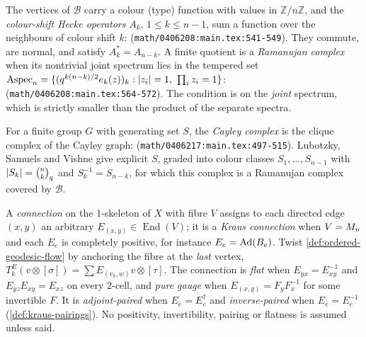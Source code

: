 \begin{definition}
\label{def:bruhat-tits-building}
The vertices of $\mathcal B$ carry a colour (type) function with values in
$\mathbb Z/n\mathbb Z$, and the \emph{colour-shift Hecke operators} $A_k$,
$1\le k\le n-1$, sum a function over the neighbours of colour shift $k$:
{\small\texttt{}}
(\texttt{math/0406208:main.tex:541-549}). They commute, are normal, and satisfy
$A_k^* = A_{n-k}$. A finite quotient is a \emph{Ramanujan complex} when its
nontrivial joint spectrum lies in the tempered set
$\mathrm{Aspec}_n = \{(q^{k(n-k)/2}e_k(z))_k : |z_i| = 1,\ \prod_iz_i = 1\}$:
{\small\texttt{}}
(\texttt{math/0406208:main.tex:564-572}). The condition is on the \emph{joint}
spectrum, which is strictly smaller than the product of the separate spectra.
\end{definition}

\begin{definition}
\label{def:cayley-complex}
For a finite group $G$ with generating set $S$, the \emph{Cayley complex} is the
clique complex of the Cayley graph:
{\small\texttt{}}
(\texttt{math/0406217:main.tex:497-515}). Lubotzky, Samuels and Vishne give
explicit $S$, graded into colour classes $S_1,\dots,S_{n-1}$ with
$|S_k| = \binom{n}{k}_{q}$ and $S_k^{-1} = S_{n-k}$, for which this complex is
a Ramanujan complex covered by $\mathcal B$.
\end{definition}

\begin{definition}
\label{def:kraus-connection}
A \emph{connection} on the 1-skeleton of $X$ with fibre $V$ assigns to each
directed edge $(x,y)$ an arbitrary $E_{(x,y)}\in\operatorname{End}(V)$; it is a
\emph{Kraus connection} when $V = M_n$ and each $E_e$ is completely positive,
for instance $E_e = \operatorname{Ad}(B_e)$. Twist \cref{def:ordered-geodesic-flow} by
anchoring the fibre at the \emph{last} vertex,
$T^E_k(v\otimes[\sigma]) = \sum E_{(v_k,w)}v\otimes[\tau]$. The connection is %
\emph{flat} when $E_{yx} = E_{xy}^{-1}$ and $E_{yz}E_{xy} = E_{xz}$ on every
$2$-cell, and \emph{pure gauge} when $E_{(x,y)} = F_yF_x^{-1}$ for some
invertible $F$. It is \emph{adjoint-paired} when $E_{\bar e} = E_e^\dagger$ and
\emph{inverse-paired} when $E_{\bar e} = E_e^{-1}$
(\cref{def:kraus-pairings}). No positivity, invertibility, pairing or flatness
is assumed unless said.
\end{definition}

